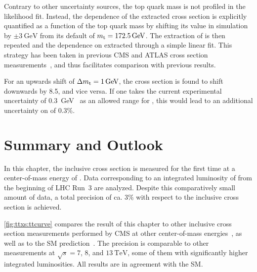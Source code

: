 Contrary to other uncertainty sources, the top quark mass is not profiled in the likelihood fit. Instead, the dependence of the extracted \ttbar cross section is explicitly quantified as a function of the top quark mass by shifting its value in simulation by $\pm \SI{3}{\GeV}$ from its default of $\mt = \SI{172.5}{\GeV}$.
The extraction of \sigmatt is then repeated and the dependence on \mt extracted through a simple linear fit. This strategy has been taken in previous CMS and ATLAS \ttbar cross section measurements~\cite{CMS:TOP-17-001,ATLAS:2020aln}, and thus facilitates comparison with previous results.

For an upwards shift of $\Delta \mt = \SI{1}{\GeV}$, the \ttbar cross section is found to shift downwards by \SI{8.5}{\pb}, and vice versa. If one takes the current experimental uncertainty of \SI{0.3}{\GeV}~\cite{PDG:2022pth} as an allowed range for \mt, this would lead to an additional uncertainty on \sigmatt of 0.3\%.

\section{Summary and Outlook}
\label{sec:ttxs:summary}

In this chapter, the inclusive \ttbar cross section is measured for the first time at a center-of-mass energy of \sqrtsRIII. Data corresponding to an integrated luminosity of \lumiRIII from the beginning of LHC Run~3 are analyzed. Despite this comparatively small amount of data, a total precision of ca. 3\% with respect to the inclusive cross section is achieved.

\cref{fig:ttxs:ttcurve} compares the result of this chapter to other inclusive \ttbar cross section measurements performed by CMS at other center-of-mass energies~\cite{CMS:TOP-17-001, CMS:TOP-11-007, CMS:TOP-14-018, CMS:TOP-12-006, CMS:TOP-13-004, CMS:TOP-18-005, CMS:TOP-20-001, CMS:TOP-20-004}, as well as to the SM prediction~\cite{Czakon:2013goa}. The precision is comparable to other measurements at $\sqrt{s} = 7$, $8$, and $\SI{13}{\TeV}$, some of them with significantly higher integrated luminosities. All results are in agreement with the SM.

